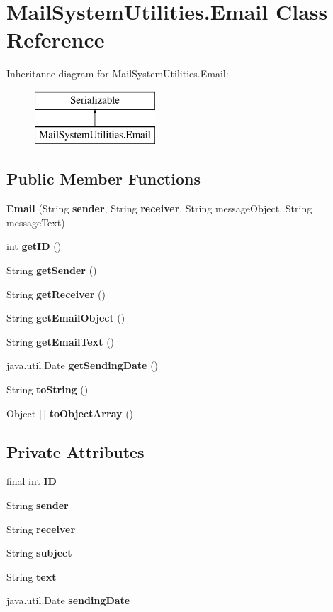 \section{Mail\+System\+Utilities.\+Email Class Reference}
\label{class_mail_system_utilities_1_1_email}
Inheritance diagram for Mail\+System\+Utilities.\+Email\+:\begin{figure}[H]
\begin{center}
\leavevmode
\includegraphics[height=2.000000cm]{class_mail_system_utilities_1_1_email}
\end{center}
\end{figure}
\subsection*{Public Member Functions}
\begin{DoxyCompactItemize}
\item 
\textbf{ Email} (String \textbf{ sender}, String \textbf{ receiver}, String message\+Object, String message\+Text)
\item 
int \textbf{ get\+ID} ()
\item 
String \textbf{ get\+Sender} ()
\item 
String \textbf{ get\+Receiver} ()
\item 
String \textbf{ get\+Email\+Object} ()
\item 
String \textbf{ get\+Email\+Text} ()
\item 
java.\+util.\+Date \textbf{ get\+Sending\+Date} ()
\item 
String \textbf{ to\+String} ()
\item 
Object [$\,$] \textbf{ to\+Object\+Array} ()
\end{DoxyCompactItemize}
\subsection*{Private Attributes}
\begin{DoxyCompactItemize}
\item 
final int \textbf{ ID}
\item 
String \textbf{ sender}
\item 
String \textbf{ receiver}
\item 
String \textbf{ subject}
\item 
String \textbf{ text}
\item 
java.\+util.\+Date \textbf{ sending\+Date}
\end{DoxyCompactItemize}
